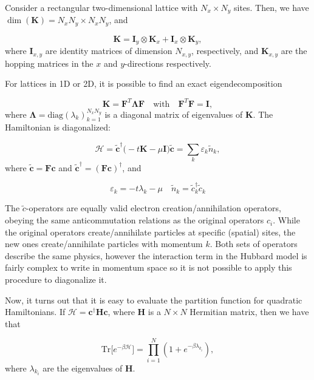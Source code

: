 Consider a rectangular two-dimensional lattice with $N_x \times N_y$ sites. Then, we have $\dim(\bm K) = N_x N_y \times N_x N_y $, and

\begin{equation}
\bm K = \bm I_y \otimes \bm K_x + \bm I_x \otimes \bm K_y ,
\end{equation}
where $\bm I_{x, y}$ are identity matrices of dimension $N_{x, y}$, respectively, and $\bm K_{x, y}$ are the hopping matrices in the $x$ and $y$-directions respectively.

For lattices in 1D or 2D, it is possible to find an exact eigendecomposition

\begin{equation}
\bm K = \bm F^T \bm \Lambda \bm F \quad \text{with}  \quad \bm F^T \bm F = \bm I ,
\end{equation}
where $\bm \Lambda = \text{diag}(\lambda_k)_{k = 1}^{N_x N_y}$ is a diagonal matrix of eigenvalues of $\bm K$.
The Hamiltonian is diagonalized:

\begin{equation}\label{eq:quadraticH}
\mathcal{H} =\tilde{\bm c}^\dagger \big( -t \bm K - \mu \bm I \big) \tilde{\bm c} = \sum_k \varepsilon_k \tilde{n}_k ,
\end{equation}
where $\tilde{\bm c} = \bm F \bm c$ and $\tilde{\bm c}^\dagger = (\bm F \bm c)^\dagger$, and

\begin{equation}
\varepsilon_k = -t \lambda_k - \mu \quad \tilde{n}_k = \tilde{c}_k^\dagger \tilde{c}_k
\end{equation}

The $\tilde{c}$-operators are equally valid electron creation/annihilation operators, obeying the same anticommutation relations as the original operators $c_i$.
While the original operators create/annihilate particles at specific (spatial) sites, the new ones create/annihilate particles with momentum $k$.
Both sets of operators describe the same physics, however the interaction term in the Hubbard model is fairly complex to write in momentum space so it is not possible to apply this procedure to diagonalize it.

\bigskip

Now, it turns out that it is easy to evaluate the partition function for quadratic Hamiltonians. If $\mathcal{H} = \bm c^\dagger \bm H \bm c$, where $\bm H$ is a $N \times N$ Hermitian matrix, then we have that

\begin{equation}\label{eq:trace_quadratic}
\text{Tr} \big[ e^{-\beta \mathcal{H} } \big] = \prod_{i=1}^N ( 1 + e^{-\beta \lambda_{k_i} } ) ,
\end{equation}
where $\lambda_{k_i}$ are the eigenvalues of $\bm H$.

